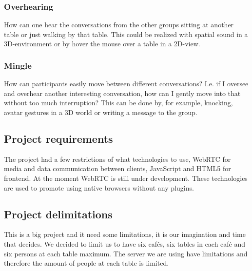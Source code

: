 \documentclass[12pt, titlepage]{article}
\begin{document}
\subsubsection{Overhearing}
How can one hear the conversations from the other groups sitting at another table or just walking by that table. This could be realized with spatial sound in a 3D-environment or by hover the mouse over a table in a 2D-view.
\subsubsection{Mingle}
How can participants easily move between different conversations? I.e. if I oversee and overhear another interesting conversation, how can I gently move into that without too much interruption? This can be done by, for example, knocking, avatar gestures in a 3D world or writing a message to the group.

\subsection{Project requirements}
The project had a few restrictions of what technologies to use, WebRTC for media and data communication between clients, JavaScript and HTML5 for frontend. At the moment WebRTC is still under development. These technologies are used to promote using native browsers without any plugins.
\subsection{Project delimitations}
This is a big project and it need some limitations, it is our imagination and time that decides. We decided to limit us to have six cafés, six tables in each café and six persons at each table maximum. The server we are using have limitations and therefore the amount of people at each table is limited.
\end{document}
